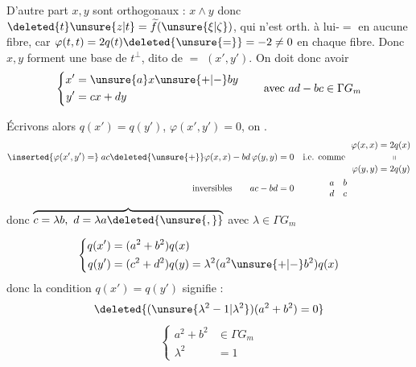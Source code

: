 
D'autre part $x,y$ sont orthogonaux : $x\wedge y$ donc  $\deleted{t}\unsure{z|t}=\widetilde f(\unsure{\xi|\zeta})$, qui n'est  orth. à lui-$=$ en aucune fibre, car $\varphi(t,t)=2q(t)\deleted{\unsure{=}}=-2\ne0$ en chaque fibre. Donc $x,y$ forment une base de $t^\perp$, dito de $=$ $(x',y')$. On doit donc avoir
\[
\left\{\begin{aligned}x'&=\unsure{a}x\unsure{+|-}by\\y'&=cx+dy\end{aligned}\right.\qquad\text{avec }ad-bc\in\Gamma G_m
\]

 Écrivons alors $q(x')=q(y')$, $\varphi(x',y')=0$, on . 
\[
\begin{aligned}\inserted{\varphi(x',y')=}\;ac\deleted{\unsure{+}}\varphi(x,x)-bd\,\varphi(y,y)&=0\quad\text{i.e. comme }\ \begin{aligned}\varphi(x,x)&=2q(x)\\[-.4ex] &\hspace{1.4em}\shortparallel\\[-.4ex]\varphi(y,y)&=2q(y)\end{aligned}\\[-.1ex]\text{inversibles}\qquad ac-bd&=0 \qquad\qquad \begin{matrix}a&b\\d&c\end{matrix}\end{aligned}
\]
donc $\overbrace{c=\lambda b,\ d=\lambda a\deleted{\unsure{,}}}$ avec $\lambda\in\Gamma G_m$

 
\[
\left\{\begin{aligned}q(x')&=(a^2+b^2)q(x)\\q(y')&=(c^2+d^2)q(y)=\lambda^2(a^2\unsure{+|-}b^2)q(x)\end{aligned}\right.
\]
donc la condition $q(x')=q(y')$  signifie :
\[
\deleted{(\unsure{\lambda^2-1|\lambda^2})(a^2+b^2)=0}
\]
\[
\left\{\begin{aligned}a^2+b^2&\in\Gamma G_m\\\lambda^2&=1\end{aligned}\right.
\]

\qquad {}
